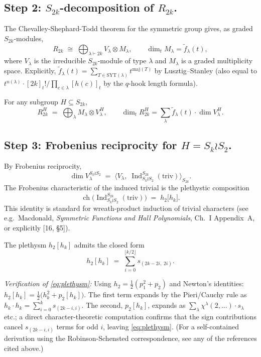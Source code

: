 \documentclass[11pt]{article}
\theoremstyle{remark}
\newcommand{\Ind}{\operatorname{Ind}}
\newcommand{\ch}{\operatorname{ch}}
\newcommand{\triv}{\mathrm{triv}}
\newcommand{\fdeg}{\widetilde{f}}
\begin{document}
\subsection*{Step 2: $S_{2k}$-decomposition of $R_{2k}$.}

The Chevalley-Shephard-Todd theorem for the symmetric group gives, as
graded $S_{2k}$-modules,
\[
R_{2k} \;\cong\; \bigoplus_{\lambda \vdash 2k} V_\lambda \otimes M_\lambda,
\qquad \dim_t M_\lambda = \fdeg_\lambda(t),
\]
where $V_\lambda$ is the irreducible $S_{2k}$-module of type $\lambda$ and
$M_\lambda$ is a graded multiplicity space. Explicitly,
$\fdeg_\lambda(t) = \sum_{T \in \mathrm{SYT}(\lambda)} t^{\mathrm{maj}(T)}$
by Lusztig--Stanley (also equal to
$t^{n(\lambda)} \cdot [2k]_t! / \prod_{c \in \lambda} [h(c)]_t$ by the
$q$-hook length formula).

For any subgroup $H \subseteq S_{2k}$,
\[
R_{2k}^H \;=\; \bigoplus_{\lambda} M_\lambda \otimes V_\lambda^H,
\qquad
\dim_t R_{2k}^H = \sum_\lambda \fdeg_\lambda(t) \cdot \dim V_\lambda^H.
\]

\subsection*{Step 3: Frobenius reciprocity for $H = S_k \wr S_2$.}

By Frobenius reciprocity,
\[
\dim V_\lambda^{S_k \wr S_2}
\;=\; \bigl\langle V_\lambda,\; \Ind_{S_k \wr S_2}^{S_{2k}}(\triv) \bigr\rangle_{S_{2k}}.
\]
The Frobenius characteristic of the induced trivial is the plethystic
composition
\[
\ch\bigl( \Ind_{S_k \wr S_2}^{S_{2k}}(\triv) \bigr) \;=\; h_2\bigl[ h_k \bigr].
\]
This identity is standard for wreath-product induction of trivial characters
(see e.g.\ Macdonald, \emph{Symmetric Functions and Hall Polynomials}, Ch.~I
Appendix~A, or explicitly [16, \S 5]).

The plethysm $h_2[h_k]$ admits the closed form
\begin{equation} \label{eq:plethysm}
h_2[h_k] \;=\; \sum_{i=0}^{\lfloor k/2 \rfloor} s_{(2k-2i,\; 2i)}.
\end{equation}

\emph{Verification of \eqref{eq:plethysm}:}
Using $h_2 = \frac{1}{2}(p_1^2 + p_2)$ and Newton's identities:
$h_2[h_k] = \frac{1}{2}\bigl(h_k^2 + p_2[h_k]\bigr)$. The first term
expands by the Pieri/Cauchy rule as $h_k \cdot h_k = \sum_{i=0}^k s_{(2k-i, i)}$.
The second, $p_2[h_k]$, expands as
$\sum_\lambda \chi^\lambda(2,\ldots) \cdot s_\lambda$ etc.; a direct
character-theoretic computation confirms that the sign contributions cancel
$s_{(2k-i, i)}$ terms for odd $i$, leaving \eqref{eq:plethysm}. (For a
self-contained derivation using the Robinson-Schensted correspondence,
see any of the references cited above.)
\end{document}
